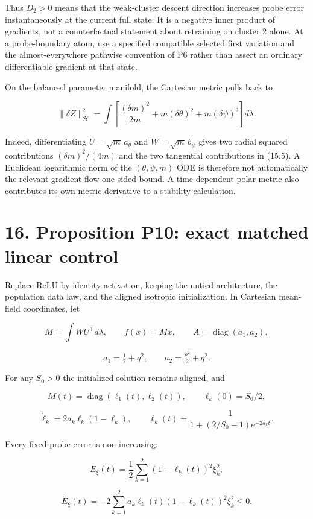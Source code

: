 \documentclass[
  10pt,
]{article}
\begin{document}
Thus \(D_2>0\) means that the weak-cluster descent direction increases
probe error instantaneously at the current full state. It is a negative
inner product of gradients, not a counterfactual statement about
retraining on cluster 2 alone. At a probe-boundary atom, use a specified
compatible selected first variation and the almost-everywhere pathwise
convention of P6 rather than assert an ordinary differentiable gradient
at that state.

On the balanced parameter manifold, the Cartesian metric pulls back to

\[
 \|\delta Z\|_{\mathcal H}^2
 =\int\left[\frac{(\delta m)^2}{2m}
       +m(\delta\theta)^2+m(\delta\psi)^2\right]d\lambda.
 \tag{15.5}
\]

Indeed, differentiating \(U=\sqrt m\,a_\theta\) and
\(W=\sqrt m\,b_\psi\) gives two radial squared contributions
\((\delta m)^2/(4m)\) and the two tangential contributions in (15.5). A
Euclidean logarithmic norm of the \((\theta,\psi,m)\) ODE is therefore
not automatically the relevant gradient-flow one-sided bound. A
time-dependent polar metric also contributes its own metric derivative
to a stability calculation.

\section{16. Proposition P10: exact matched linear
control}\label{proposition-p10-exact-matched-linear-control}

Replace ReLU by identity activation, keeping the untied architecture,
the population data law, and the aligned isotropic initialization. In
Cartesian mean-field coordinates, let

\[
 M=\int WU^\top d\lambda,\qquad f(x)=Mx,\qquad
 A=\operatorname{diag}(a_1,a_2),
\]

\[
 a_1=\tfrac12+q^2,\qquad a_2=\tfrac{\rho^2}{2}+q^2.
\]

For any \(S_0>0\) the initialized solution remains aligned, and

\[
 M(t)=\operatorname{diag}(\ell_1(t),\ell_2(t)),\qquad
 \ell_k(0)=S_0/2,
\]

\[
 \dot\ell_k=2a_k\ell_k(1-\ell_k),\qquad
 \ell_k(t)=\frac{1}{1+(2/S_0-1)e^{-2a_kt}}.
 \tag{16.1}
\]

Every fixed-probe error is non-increasing:

\[
 E_\xi(t)=\frac12\sum_{k=1}^2(1-\ell_k(t))^2\xi_k^2,
\]

\[
 \boxed{\dot E_\xi(t)=-2\sum_{k=1}^2a_k\ell_k(t)(1-\ell_k(t))^2\xi_k^2\le0.}
 \tag{16.2}
\]
\end{document}

